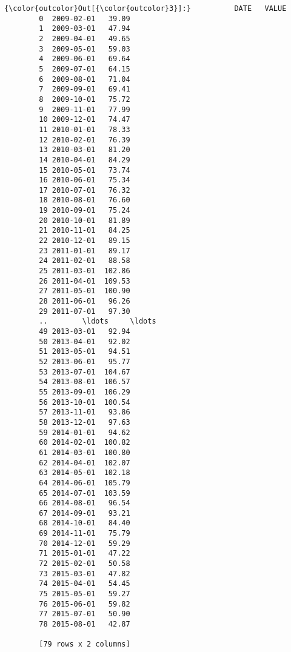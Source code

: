 \documentclass{article}
\begin{document}
            \begin{Verbatim}[commandchars=\\\{\}]
{\color{outcolor}Out[{\color{outcolor}3}]:}          DATE   VALUE
        0  2009-02-01   39.09
        1  2009-03-01   47.94
        2  2009-04-01   49.65
        3  2009-05-01   59.03
        4  2009-06-01   69.64
        5  2009-07-01   64.15
        6  2009-08-01   71.04
        7  2009-09-01   69.41
        8  2009-10-01   75.72
        9  2009-11-01   77.99
        10 2009-12-01   74.47
        11 2010-01-01   78.33
        12 2010-02-01   76.39
        13 2010-03-01   81.20
        14 2010-04-01   84.29
        15 2010-05-01   73.74
        16 2010-06-01   75.34
        17 2010-07-01   76.32
        18 2010-08-01   76.60
        19 2010-09-01   75.24
        20 2010-10-01   81.89
        21 2010-11-01   84.25
        22 2010-12-01   89.15
        23 2011-01-01   89.17
        24 2011-02-01   88.58
        25 2011-03-01  102.86
        26 2011-04-01  109.53
        27 2011-05-01  100.90
        28 2011-06-01   96.26
        29 2011-07-01   97.30
        ..        \ldots     \ldots
        49 2013-03-01   92.94
        50 2013-04-01   92.02
        51 2013-05-01   94.51
        52 2013-06-01   95.77
        53 2013-07-01  104.67
        54 2013-08-01  106.57
        55 2013-09-01  106.29
        56 2013-10-01  100.54
        57 2013-11-01   93.86
        58 2013-12-01   97.63
        59 2014-01-01   94.62
        60 2014-02-01  100.82
        61 2014-03-01  100.80
        62 2014-04-01  102.07
        63 2014-05-01  102.18
        64 2014-06-01  105.79
        65 2014-07-01  103.59
        66 2014-08-01   96.54
        67 2014-09-01   93.21
        68 2014-10-01   84.40
        69 2014-11-01   75.79
        70 2014-12-01   59.29
        71 2015-01-01   47.22
        72 2015-02-01   50.58
        73 2015-03-01   47.82
        74 2015-04-01   54.45
        75 2015-05-01   59.27
        76 2015-06-01   59.82
        77 2015-07-01   50.90
        78 2015-08-01   42.87
        
        [79 rows x 2 columns]
\end{Verbatim}
        
\end{document}
